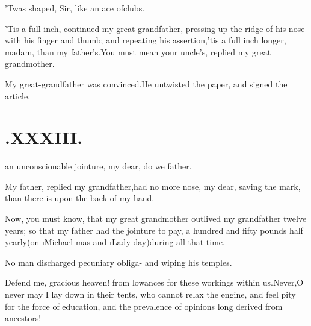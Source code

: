 \documentclass[twoside]{article}
\begin{document}
\tsh ’Twas shaped, Sir, like an ace of\break clubs.

\tsh ’Tis a full inch, continued my great grandfather,
pressing up the ridge of his nose with his finger and thumb; and
repeating his assertion,\tsh ’tis a full inch longer,
madam, than my father’s\tsh.\break You must mean your
uncle’s, replied my great grandmother.

\tsh My great-grandfather was convinced.\tsk He
untwisted the paper, and signed the article.

\section{.\quad  XXXIII.}

 an unconscionable\break
jointure, my dear, do we
father.

My father, replied my grandfather,\break had no more nose, my dear,
saving the mark, than there is upon the back of my\break
hand.\tsh

\tsk Now, you must know, that my great grandmother outlived my
grandfather twelve years; so that my father
had the
jointure to pay, a hundred and fifty pounds half yearly\tsk (on
\i{Michael-\break mas} and \i{Lady day})\tsk during all
that\break
time.

No man discharged pecuniary obliga-
and wiping his temples.

Defend me, gracious heaven! from 
lowances for these workings within us.\tsk Never,\tsk O never may I lay down in their
tents, who cannot relax the engine, and feel pity for the force of
education, and the prevalence of opinions long derived from
ancestors!
\end{document}
